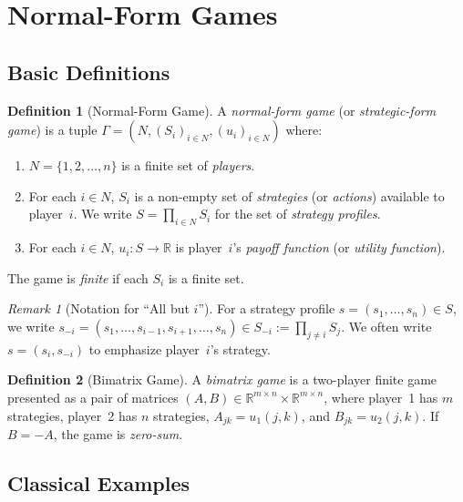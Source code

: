 \documentclass[11pt,a4paper]{article}
\theoremstyle{definition}
\newtheorem{definition}{Definition}[section]
\theoremstyle{plain}
\theoremstyle{remark}
\newtheorem{remark}{Remark}[section]
\newcommand{\R}{\mathbb{R}}
\begin{document}
\section{Normal-Form Games}
\label{sec:normal_form}

\subsection{Basic Definitions}
\label{subsec:normal_form_def}

\begin{definition}[Normal-Form Game]
\label{def:normal_form}
A \emph{normal-form game} (or \emph{strategic-form game}) is a tuple
$\Gamma = (N, (S_i)_{i \in N}, (u_i)_{i \in N})$ where:
\begin{enumerate}[nosep,label=(\roman*)]
    \item $N = \{1, 2, \ldots, n\}$ is a finite set of \emph{players}.
    \item For each $i \in N$, $S_i$ is a non-empty set of \emph{strategies}
    (or \emph{actions}) available to player~$i$. We write
    $S = \prod_{i \in N} S_i$ for the set of \emph{strategy profiles}.
    \item For each $i \in N$, $u_i : S \to \R$ is player~$i$'s \emph{payoff function}
    (or \emph{utility function}).
\end{enumerate}
The game is \emph{finite} if each $S_i$ is a finite set.
\end{definition}

\begin{remark}[Notation for ``All but $i$'']
\label{rem:notation}
For a strategy profile $s = (s_1, \ldots, s_n) \in S$, we write
$s_{-i} = (s_1, \ldots, s_{i-1}, s_{i+1}, \ldots, s_n) \in S_{-i}
:= \prod_{j \neq i} S_j$.
We often write $s = (s_i, s_{-i})$ to emphasize player~$i$'s strategy.
\end{remark}

\begin{definition}[Bimatrix Game]
\label{def:bimatrix}
A \emph{bimatrix game} is a two-player finite game presented as a pair of matrices
$(A, B) \in \R^{m \times n} \times \R^{m \times n}$, where player~1 has $m$ strategies,
player~2 has $n$ strategies, $A_{jk} = u_1(j,k)$, and $B_{jk} = u_2(j,k)$.
If $B = -A$, the game is \emph{zero-sum}.
\end{definition}

\subsection{Classical Examples}
\label{subsec:examples}
\end{document}

